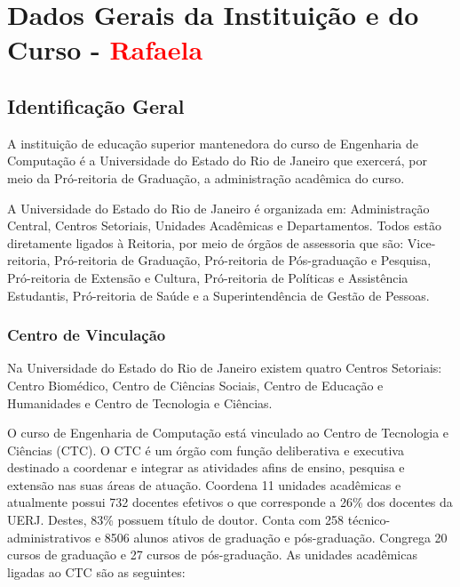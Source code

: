 \chapter{Dados Gerais da Instituição e do Curso - \textcolor{red}{Rafaela}}


\section{Identificação Geral}

A instituição de educação superior mantenedora do curso de Engenharia de Computação é a Universidade do Estado do Rio de Janeiro que exercerá, por meio da Pró-reitoria de Graduação, a administração acadêmica do curso.

A Universidade do Estado do Rio de Janeiro é organizada em: Administração Central, Centros Setoriais, Unidades Acadêmicas e Departamentos. Todos estão diretamente ligados à Reitoria, por meio de órgãos de assessoria que são: Vice-reitoria, Pró-reitoria de Graduação, Pró-reitoria de Pós-graduação e Pesquisa, Pró-reitoria de Extensão e Cultura, Pró-reitoria de Políticas e Assistência Estudantis, Pró-reitoria de Saúde e a Superintendência de Gestão de Pessoas.

\subsection{Centro de Vinculação}

Na Universidade do Estado do Rio de Janeiro existem quatro Centros Setoriais: Centro Biomédico, Centro de Ciências Sociais, Centro de Educação e Humanidades e Centro de Tecnologia e Ciências.

O curso de Engenharia de Computação está vinculado ao Centro de Tecnologia e Ciências (CTC).
O CTC é um órgão com função deliberativa e executiva destinado a coordenar e integrar as atividades afins de ensino, pesquisa e extensão nas suas áreas de atuação. Coordena 11 unidades acadêmicas e atualmente possui 732 docentes efetivos o que corresponde a 26\% dos docentes da UERJ. Destes, 83\% possuem título de doutor. Conta com 258 técnico-administrativos e 8506 alunos ativos de graduação e pós-graduação. Congrega 20 cursos de graduação e 27 cursos de pós-graduação. As unidades acadêmicas ligadas ao CTC são as seguintes:

